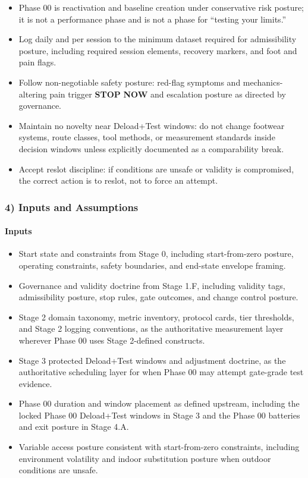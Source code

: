 \documentclass[10pt]{article}
\begin{document}
\begin{itemize}
\item Phase 00 is reactivation and baseline creation under conservative risk posture; it is not a performance phase and is not a phase for “testing your limits.”
\item Log daily and per session to the minimum dataset required for admissibility posture, including required session elements, recovery markers, and foot and pain flags.
\item Follow non-negotiable safety posture: red-flag symptoms and mechanics-altering pain trigger \textbf{STOP} \textbf{NOW} and escalation posture as directed by governance.
\item Maintain no novelty near Deload+Test windows: do not change footwear systems, route classes, tool methods, or measurement standards inside decision windows unless explicitly documented as a comparability break.
\item Accept reslot discipline: if conditions are unsafe or validity is compromised, the correct action is to reslot, not to force an attempt.
\end{itemize}

\subsubsection*{4) Inputs and Assumptions}

\paragraph*{Inputs}

\begin{itemize}
\item Start state and constraints from Stage 0, including start-from-zero posture, operating constraints, safety boundaries, and end-state envelope framing.
\item Governance and validity doctrine from Stage 1.F, including validity tags, admissibility posture, stop rules, gate outcomes, and change control posture.
\item Stage 2 domain taxonomy, metric inventory, protocol cards, tier thresholds, and Stage 2 logging conventions, as the authoritative measurement layer wherever Phase 00 uses Stage 2-defined constructs.
\item Stage 3 protected Deload+Test windows and adjustment doctrine, as the authoritative scheduling layer for when Phase 00 may attempt gate-grade test evidence.
\item Phase 00 duration and window placement as defined upstream, including the locked Phase 00 Deload+Test windows in Stage 3 and the Phase 00 batteries and exit posture in Stage 4.A.
\item Variable access posture consistent with start-from-zero constraints, including environment volatility and indoor substitution posture when outdoor conditions are unsafe.
\end{itemize}
\end{document}

